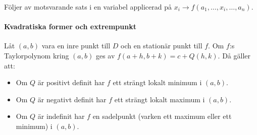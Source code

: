 \proof
Följer av motsvarande sats i en variabel applicerad på $x_i\to f(a_1, \dots, x_i, \dots, a_n)$.

\paragraph{Kvadratiska former och extrempunkt}
Låt $(a, b)$ vara en inre punkt till $D$ och en stationär punkt till $f$. Om $f$:s Taylorpolynom kring $(a, b)$ ges av $f(a + h, b + k) = c + Q(h, k)$. Då gäller att:
\begin{itemize}
	\item Om $Q$ är positivt definit har $f$ ett strängt lokalt minimum i $(a, b)$.
	\item Om $Q$ är negativt definit har $f$ ett strängt lokalt maximum i $(a, b)$.
	\item Om $Q$ är indefinit har $f$ en sadelpunkt (varken ett maximum eller ett minimum) i $(a, b)$.
\end{itemize}
